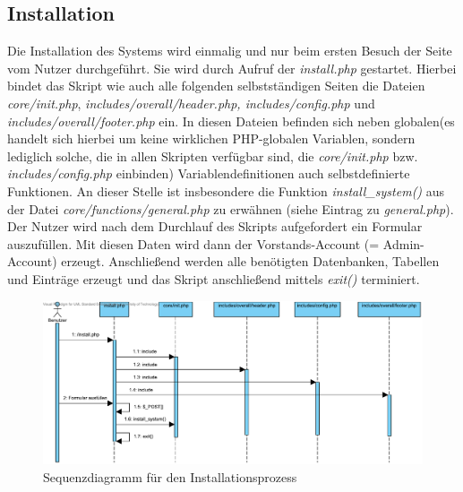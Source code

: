 \documentclass[fontsize = 12pt, paper = a4]{scrreprt}
\begin{document}
\subsection{Installation}
Die Installation des Systems wird einmalig und nur beim ersten Besuch der Seite vom Nutzer durchgeführt. Sie wird durch Aufruf der \textit{install.php} gestartet. Hierbei bindet das Skript wie auch alle folgenden selbstständigen Seiten die Dateien \textit{core/init.php}, \textit{includes/overall/header.php, includes/config.php} und \textit{includes/overall/footer.php} ein. In diesen Dateien befinden sich neben \glqq globalen\grqq (es handelt sich hierbei um keine wirklichen PHP-globalen Variablen, sondern lediglich solche, die in allen Skripten verfügbar sind, die \textit{core/init.php} bzw. \textit{includes/config.php} einbinden) Variablendefinitionen auch selbstdefinierte Funktionen. An dieser Stelle ist insbesondere die Funktion \textit{install\_system()} aus der Datei \textit{core/functions/general.php} zu erwähnen (siehe Eintrag zu \textit{general.php}).\\
Der Nutzer wird nach dem Durchlauf des Skripts aufgefordert ein Formular auszufüllen. Mit diesen Daten wird dann der Vorstands-Account (= Admin-Account) erzeugt. Anschließend werden alle benötigten Datenbanken, Tabellen und Einträge erzeugt und das Skript anschließend mittels \textit{exit()} terminiert.

\begin{figure}[h]
\centering
\includegraphics[scale = 0.6]{installation}
\caption[Sequenzdiagramm f\"{u}r den Installationsprozess]{Sequenzdiagramm f\"{u}r den Installationsprozess}
\label{install}
\end{figure}

\newpage
\end{document}
